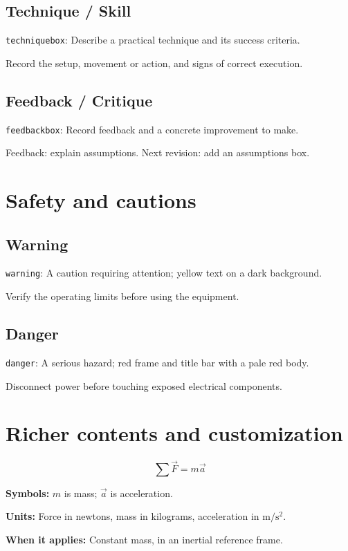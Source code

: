 \documentclass[11pt]{article}
\newcommand{\NotesField}[2]{\par\noindent\textbf{#1:} #2\par}
\begin{document}
\subsection{Technique / Skill}
{\small\texttt{techniquebox}: Describe a practical technique and its success criteria.}
\begin{techniquebox}
Record the setup, movement or action, and signs of correct execution.
\end{techniquebox}
\subsection{Feedback / Critique}
{\small\texttt{feedbackbox}: Record feedback and a concrete improvement to make.}
\begin{feedbackbox}
Feedback: explain assumptions. Next revision: add an assumptions box.
\end{feedbackbox}

\clearpage
\section{Safety and cautions}
\subsection{Warning}
{\small\texttt{warning}: A caution requiring attention; yellow text on a dark background.}
\begin{warning}
Verify the operating limits before using the equipment.
\end{warning}
\subsection{Danger}
{\small\texttt{danger}: A serious hazard; red frame and title bar with a pale red body.}
\begin{danger}
Disconnect power before touching exposed electrical components.
\end{danger}

\clearpage
\section{Richer contents and customization}
\begin{formulabox}[title={Newton's Second Law},label={box:newton}]
\[
  \sum \vec{F}=m\vec{a}
\]
\NotesField{Symbols}{$m$ is mass; $\vec{a}$ is acceleration.}
\NotesField{Units}{Force in newtons, mass in kilograms, acceleration in $\mathrm{m/s^2}$.}
\NotesField{When it applies}{Constant mass, in an inertial reference frame.}
\end{formulabox}
\end{document}
